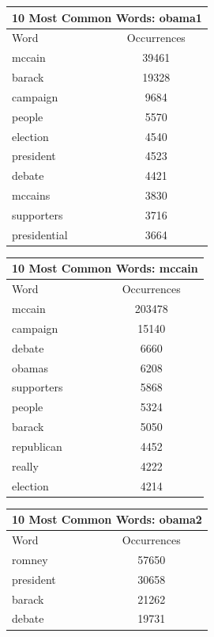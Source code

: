 \documentclass[12pt,a4paper]{report}
\begin{document}
  \begin{table}[ht]
    \begin{tabular}[t]{|l|c|}
      \hline
      \multicolumn{2}{|c|}{10 Most Common Words: obama1} \\
      \hline
      \hline
      Word & Occurrences \\ 
      \hline
      mccain & 39461 \\
      barack & 19328 \\
      campaign & 9684 \\
      people & 5570 \\
      election & 4540 \\
      president & 4523 \\
      debate & 4421 \\
      mccains & 3830 \\
      supporters & 3716 \\
      presidential & 3664 \\
      \hline
    \end{tabular}\hfill%
    \begin{tabular}[t]{|l|c|}
      \hline
      \multicolumn{2}{|c|}{10 Most Common Words: mccain} \\
      \hline
      \hline
      Word & Occurrences \\ [0.5ex]
      \hline
      mccain & 203478 \\
      campaign & 15140 \\
      debate & 6660 \\
      obamas & 6208 \\
      supporters & 5868 \\
      people & 5324 \\
      barack & 5050 \\
      republican & 4452 \\
      really & 4222 \\
      election & 4214 \\
      \hline
    \end{tabular}\hfill%
    \begin{tabular}[t]{|l|c|}
      \hline
      \multicolumn{2}{|c|}{10 Most Common Words: obama2} \\
      \hline
      Word & Occurrences \\ [0.5ex]
      \hline
      \hline
      romney & 57650 \\
      president & 30658 \\
      barack & 21262 \\
      debate & 19731 \\

\end{tabular}
\end{table}
\end{document}

